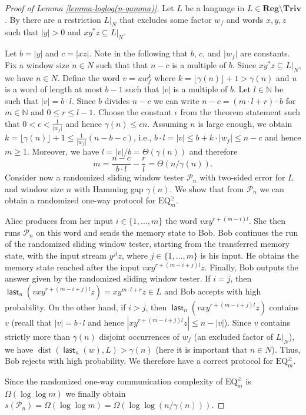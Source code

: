 \documentclass{article}\usepackage[a4paper,margin=20mm]{geometry}
\newcommand{\N}{\mathbb{N}}
\renewcommand{\P}{\mathcal{P}}
\DeclareMathOperator{\last}{\mathsf{last}}
\DeclareMathOperator{\dist}{dist}
\newcommand{\Reg}{\mathbf{Reg}}
\newcommand{\Triv}{\mathbf{Triv}}
\renewcommand{\geq}{\geqslant}
\renewcommand{\leq}{\leqslant}
\renewcommand{\le}{\leq}
\begin{document}
\begin{proof}[Proof of Lemma \ref{lemma-loglog(n-gamma)}]
Let $L$ be a language in $L \in \Reg \setminus \Triv$.
By  there 
are a restriction $L|_N$ that excludes some factor $w_f$ and words $x,y,z$ such that $|y|>0$ and 
$x y^* z \subseteq L|_N$.


Let $b = |y|$ and $c = |xz|$. Note in the following that $b$, $c$, and $|w_f|$ are constants.
Fix a window size $n\in N$ such that 
that $n-c$ is a multiple of $b$. Since $x y^*z \subseteq L|_N$, we have $n \in N$.
Define the word $v = u w_f^k$ where $k = \lfloor \gamma(n) \rfloor + 1 > \gamma(n)$ 
and $u$ is a word of length at most $b-1$ such that $|v|$ is a multiple of $b$. Let $l \in \N$ be such that $|v| = b \cdot l$. Since $b$ divides $n-c$ we can write
$n-c = (m \cdot l + r) \cdot b$ for $m \in \N$ and $0 \le r \le l-1$.
Choose the constant $\epsilon$ from the theorem statement such that
$0 < \epsilon < \frac{1}{|w_f|}$ and hence $\gamma(n) \leq \epsilon n$. 
 Assuming $n$ is large enough, we obtain 
$k =  \lfloor \gamma(n) \rfloor + 1 \leq \frac{1}{|w_f|} (n-b-c)$, i.e., 
$b \cdot l = |v| \leq b+ k \cdot |w_f|  \leq n-c$ and hence $m \geq 1$.
Moreover,  we have $l = |v|/b = \Theta(\gamma(n))$ and therefore 
$$
m = \frac{n-c}{b \cdot l} - \frac{r}{l} = \Theta(n/\gamma(n)).
$$
Consider now a randomized sliding window tester $\P_n$ with two-sided error for $L$ and window size $n$
with Hamming gap $\gamma(n)$.
We show that from $\P_n$ we can obtain a randomized one-way protocol for $\mathrm{EQ}^{\geq}_m$.

Alice produces from her input $i \in \{1,\ldots,m\}$ the word 
$v x y^{r+ (m-i) l}$.
She then runs $\P_n$ on this word and sends the memory state to Bob.
Bob continues the run of the randomized sliding window tester, starting from the transferred memory state,
with the input stream $y^{j l} z$, where $j \in \{1,\ldots,m\}$ is his input.
He obtains the memory state reached after the input $v x y^{r+(m-i+j) l} z$.
Finally, Bob outputs the  answer given by the randomized sliding window tester.
If $i = j$, then $\last_n(v x y^{r+(m-i+j) l} z) = x y^{m \cdot l + r} z  \in L$ and Bob accepts with high probability.
On the other hand, if $i > j$, then $\last_n(v x y^{r+ (m-i+j) l} z)$ contains $v$ (recall that $|v| = b \cdot l$ and hence 
$|x y^{r+(m-i+j) l} z| \leq n-|v|$). Since $v$ contains strictly more than $\gamma(n)$ disjoint occurrences of $w_f$ (an excluded factor of $L|_N$),
we have $\dist(\last_n(w),L) > \gamma(n)$ (here it is important that $n \in N$).
Thus, Bob rejects with high probability. We therefore have a correct protocol for $\mathrm{EQ}^{\geq}_m$.

Since the randomized one-way communication complexity of $\mathrm{EQ}^{\geq}_m$ is $\Omega(\log \log m)$ we finally obtain
$s(\P_n) = \Omega(\log \log m) = \Omega(\log\log(n/\gamma(n))) $.
\end{proof}
\end{document}
